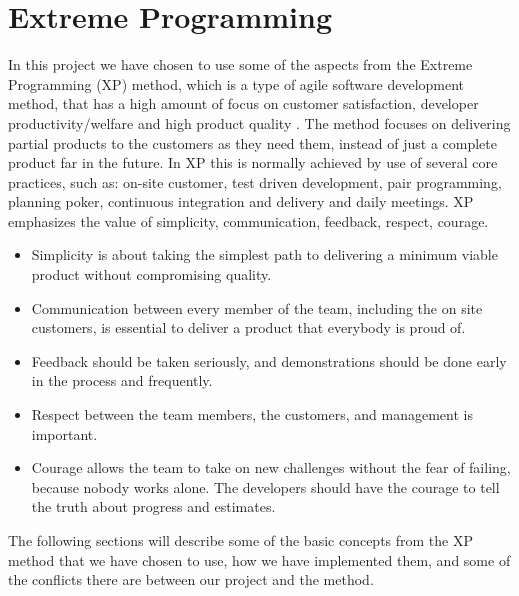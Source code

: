 
\section{Extreme Programming}
\label{sec:extreme_programming}

In this project we have chosen to use some of the aspects from the Extreme Programming (XP) method, which is a type of agile software development method, that has a high amount of focus on customer satisfaction, developer productivity/welfare and high product quality \parencite{xp}. The method focuses on delivering partial products to the customers as they need them, instead of just a complete product far in the future. In XP this is normally achieved by use of several core practices, such as: on-site customer, test driven development, pair programming, planning poker, continuous integration and delivery and daily meetings. XP emphasizes the value of simplicity, communication, feedback, respect, courage. 

\begin{itemize}
	\item Simplicity is about taking the simplest path to delivering a minimum viable product without compromising quality. 
	\item Communication between every member of the team, including the on site customers, is essential to deliver a product that everybody is proud of. 
	\item Feedback should be taken seriously, and demonstrations should be done early in the process and frequently.
	\item Respect between the team members, the customers, and management is important.
	\item Courage allows the team to take on new challenges without the fear of failing, because nobody works alone. The developers should have the courage to tell the truth about progress and estimates. 
\end{itemize}

The following sections will describe some of the basic concepts from the XP method that we have chosen to use, how we have implemented them, and some of the conflicts there are between our project and the method.

